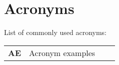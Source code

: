 
\chapter{Acronyms}
List of commonly used acronyms: \\

\begin{tabular}{llll}
\textbf{AE}		&	Acronym examples \\

\end{tabular}

